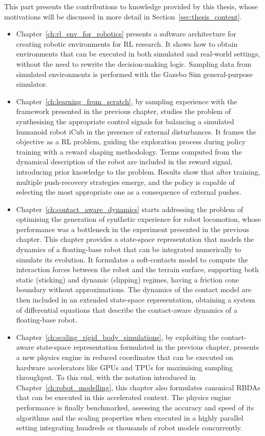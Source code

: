 This part presents the contributions to knowledge provided by this thesis, whose motivations will be discussed in more detail in Section~\ref{sec:thesis_content}.

\begin{itemize}
    \item Chapter~\ref{ch:rl_env_for_robotics} presents a software architecture for creating robotic environments for \ac{RL} research. It shows how to obtain environments that can be executed in both simulated and real-world settings, without the need to rewrite the decision-making logic. Sampling data from simulated environments is performed with the Gazebo Sim general-purpose simulator.
    \item Chapter~\ref{ch:learning_from_scratch}, by sampling experience with the framework presented in the previous chapter, studies the problem of synthesising the appropriate control signals for balancing a simulated humanoid robot iCub in the presence of external disturbances.
    It frames the objective as a \ac{RL} problem, guiding the exploration process during policy training with a reward shaping methodology.
    Terms computed from the dynamical description of the robot are included in the reward signal, introducing prior knowledge to the problem.
    Results show that after training, multiple push-recovery strategies emerge, and the policy is capable of selecting the most appropriate one as a consequence of external pushes.
    \item Chapter~\ref{ch:contact_aware_dynamics} starts addressing the problem of optimising the generation of synthetic experience for robot locomotion, whose performance was a bottleneck in the experiment presented in the previous chapter. This chapter provides a state-space representation that models the dynamics of a floating-base robot that can be integrated numerically to simulate its evolution. It formulates a soft-contacts model to compute the interaction forces between the robot and the terrain surface, supporting both static (sticking) and dynamic (slipping) regimes, having a friction cone boundary without approximations. The dynamics of the contact model are then included in an extended state-space representation, obtaining a system of differential equations that describe the contact-aware dynamics of a floating-base robot.
    \item Chapter~\ref{ch:scaling_rigid_body_simulations}, by exploiting the contact-aware state-space representation formulated in the previous chapter, presents a new physics engine in reduced coordinates that can be executed on hardware accelerators like \acsp{GPU} and \acsp{TPU} for maximising sampling throughput. To this end, with the notation introduced in Chapter~\ref{ch:robot_modelling}, this chapter also formulates canonical \aclp{RBDA} that can be executed in this accelerated context. The physics engine performance is finally benchmarked, assessing the accuracy and speed of its algorithms and the scaling properties when executed in a highly parallel setting integrating hundreds or thousands of robot models concurrently.
\end{itemize}

